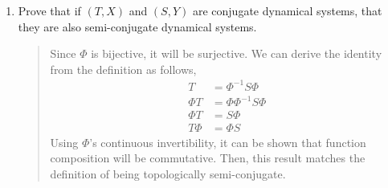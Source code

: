 \documentclass[letter]{article}
\newcommand{\Z}{\mathbb{Z}}
\begin{document}
\begin{enumerate}
\begin{enumerate}
\begin{enumerate}
\begin{quote}
				        
				        
				        
				        
				        
				        
				        
				        
				        
				    \end{quote}
					
				\end{enumerate}
			\item Prove that if $(T,X)$ and $(S,Y)$ are conjugate dynamical systems, that they are also semi-conjugate dynamical systems.
			\begin{quote}
			    Since $\Phi$ is bijective, it will be surjective. 	We can derive the identity from the definition as follows,
			    \begin{align*}
			        T &= \Phi^{-1}  S \Phi \\
			        \Phi T &= \Phi \Phi^{-1} S \Phi \\
			        \Phi T &= S \Phi \\
			        T \Phi &= \Phi S
			    \end{align*}
			    Using $\Phi$'s continuous invertibility, it can be shown that function composition will be commutative. Then, this result matches the definition of being topologically semi-conjugate.
			\end{quote}
			

\end{enumerate}
\end{enumerate}
\end{document}
